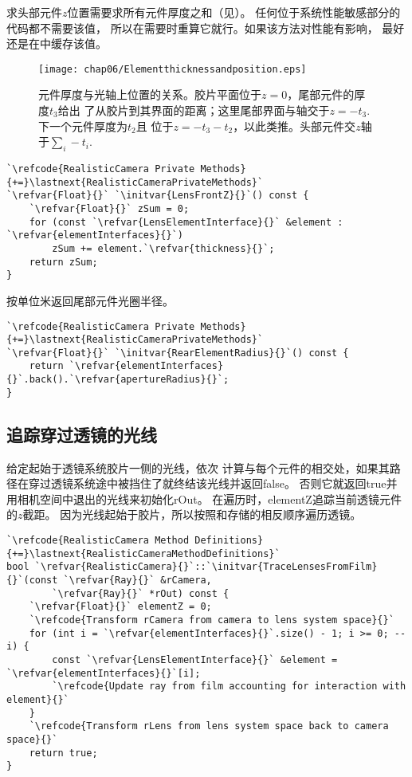 求头部元件$z$位置需要求所有元件厚度之和（见）。
任何位于系统性能敏感部分的代码都不需要该值，
所以在需要时重算它就行。如果该方法对性能有影响，
最好还是在中缓存该值。
\begin{figure}[htbp]
    \centering\texttt{[image: chap06/Elementthicknessandposition.eps]}
    \caption{元件厚度与光轴上位置的关系。胶片平面位于$z=0$，尾部元件的厚度$t_3$给出
        了从胶片到其界面的距离；这里尾部界面与轴交于$z=-t_3$.下一个元件厚度为$t_2$且
        位于$z=-t_3-t_2$，以此类推。头部元件交$z$轴于$\sum_i-t_i$.}
    \label{fig:6.18}
\end{figure}
\begin{lstlisting}
`\refcode{RealisticCamera Private Methods}{+=}\lastnext{RealisticCameraPrivateMethods}`
`\refvar{Float}{}` `\initvar{LensFrontZ}{}`() const {
    `\refvar{Float}{}` zSum = 0;
    for (const `\refvar{LensElementInterface}{}` &element : `\refvar{elementInterfaces}{}`)
        zSum += element.`\refvar{thickness}{}`;
    return zSum;
}
\end{lstlisting}

按单位米返回尾部元件光圈半径。
\begin{lstlisting}
`\refcode{RealisticCamera Private Methods}{+=}\lastnext{RealisticCameraPrivateMethods}`
`\refvar{Float}{}` `\initvar{RearElementRadius}{}`() const {
    return `\refvar{elementInterfaces}{}`.back().`\refvar{apertureRadius}{}`;
}
\end{lstlisting}
\subsection{追踪穿过透镜的光线}\label{sub:追踪穿过透镜的光线}
给定起始于透镜系统胶片一侧的光线，依次
计算与每个元件的相交处，如果其路径在穿过透镜系统途中被挡住了就终结该光线并返回{\ttfamily false}。
否则它就返回{\ttfamily true}并用相机空间中退出的光线来初始化{\ttfamily *rOut}。
在遍历时，{\ttfamily elementZ}追踪当前透镜元件的$z$截距。
因为光线起始于胶片，所以按照和存储的相反顺序遍历透镜。
\begin{lstlisting}
`\refcode{RealisticCamera Method Definitions}{+=}\lastnext{RealisticCameraMethodDefinitions}`
bool `\refvar{RealisticCamera}{}`::`\initvar{TraceLensesFromFilm}{}`(const `\refvar{Ray}{}` &rCamera,
        `\refvar{Ray}{}` *rOut) const {
    `\refvar{Float}{}` elementZ = 0;
    `\refcode{Transform rCamera from camera to lens system space}{}`
    for (int i = `\refvar{elementInterfaces}{}`.size() - 1; i >= 0; --i) {
        const `\refvar{LensElementInterface}{}` &element = `\refvar{elementInterfaces}{}`[i];
        `\refcode{Update ray from film accounting for interaction with element}{}`
    }
    `\refcode{Transform rLens from lens system space back to camera space}{}`
    return true;
}
\end{lstlisting}

